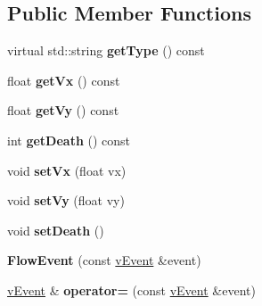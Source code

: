 \subsection*{Public Member Functions}
\begin{DoxyCompactItemize}
\item 
virtual std\+::string {\bfseries get\+Type} () const \hypertarget{classev_1_1FlowEvent_a686886dc3a21091cdc5349c5fb4f7903}{}\label{classev_1_1FlowEvent_a686886dc3a21091cdc5349c5fb4f7903}

\item 
float {\bfseries get\+Vx} () const \hypertarget{classev_1_1FlowEvent_ae95bd90698da178c65781fdc05e6f482}{}\label{classev_1_1FlowEvent_ae95bd90698da178c65781fdc05e6f482}

\item 
float {\bfseries get\+Vy} () const \hypertarget{classev_1_1FlowEvent_a663ceac71491c60565a0e169dd4dbefa}{}\label{classev_1_1FlowEvent_a663ceac71491c60565a0e169dd4dbefa}

\item 
int {\bfseries get\+Death} () const \hypertarget{classev_1_1FlowEvent_ac39faf9016620faaddccd6c15b9f513f}{}\label{classev_1_1FlowEvent_ac39faf9016620faaddccd6c15b9f513f}

\item 
void {\bfseries set\+Vx} (float vx)\hypertarget{classev_1_1FlowEvent_a0691c4ac5178ef8f517d3e16fe5b6830}{}\label{classev_1_1FlowEvent_a0691c4ac5178ef8f517d3e16fe5b6830}

\item 
void {\bfseries set\+Vy} (float vy)\hypertarget{classev_1_1FlowEvent_a783ed251482b9c064c98b4e4351b3de6}{}\label{classev_1_1FlowEvent_a783ed251482b9c064c98b4e4351b3de6}

\item 
void {\bfseries set\+Death} ()\hypertarget{classev_1_1FlowEvent_af4eb95dd9a4326790daceb7685464a89}{}\label{classev_1_1FlowEvent_af4eb95dd9a4326790daceb7685464a89}

\item 
{\bfseries Flow\+Event} (const \hyperlink{classev_1_1vEvent}{v\+Event} \&event)\hypertarget{classev_1_1FlowEvent_afad4e2f7346e329102b6df806a828e39}{}\label{classev_1_1FlowEvent_afad4e2f7346e329102b6df806a828e39}

\item 
\hyperlink{classev_1_1vEvent}{v\+Event} \& {\bfseries operator=} (const \hyperlink{classev_1_1vEvent}{v\+Event} \&event)\hypertarget{classev_1_1FlowEvent_a6f4cc54ead8eab3a04f021efa280d087}{}\label{classev_1_1FlowEvent_a6f4cc54ead8eab3a04f021efa280d087}


\end{DoxyCompactItemize}
